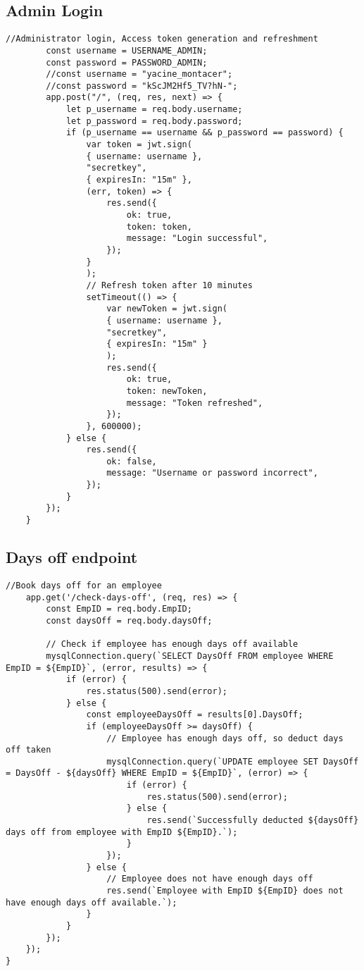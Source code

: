 \documentclass[12pt]{article}
\begin{document}
	\subsection*{Admin Login}
	\begin{lstlisting}[frame=single]
		//Administrator login, Access token generation and refreshment
		const username = USERNAME_ADMIN;
		const password = PASSWORD_ADMIN;
		//const username = "yacine_montacer";
		//const password = "kScJM2Hf5_TV?hN-";
		app.post("/", (req, res, next) => {
			let p_username = req.body.username;
			let p_password = req.body.password;
			if (p_username == username && p_password == password) {
				var token = jwt.sign(
				{ username: username },
				"secretkey",
				{ expiresIn: "15m" },
				(err, token) => {
					res.send({
						ok: true,
						token: token,
						message: "Login successful",
					});
				}
				);
				// Refresh token after 10 minutes
				setTimeout(() => {
					var newToken = jwt.sign(
					{ username: username },
					"secretkey",
					{ expiresIn: "15m" }
					);
					res.send({
						ok: true,
						token: newToken,
						message: "Token refreshed",
					});
				}, 600000);
			} else {
				res.send({
					ok: false,
					message: "Username or password incorrect",
				});
			}
		});
	}
\end{lstlisting}
\subsection*{Days off endpoint}
\begin{lstlisting}[frame=single]
	//Book days off for an employee
	app.get('/check-days-off', (req, res) => {
		const EmpID = req.body.EmpID;
		const daysOff = req.body.daysOff;
		
		// Check if employee has enough days off available
		mysqlConnection.query(`SELECT DaysOff FROM employee WHERE EmpID = ${EmpID}`, (error, results) => {
			if (error) {
				res.status(500).send(error);
			} else {
				const employeeDaysOff = results[0].DaysOff;
				if (employeeDaysOff >= daysOff) {
					// Employee has enough days off, so deduct days off taken
					mysqlConnection.query(`UPDATE employee SET DaysOff = DaysOff - ${daysOff} WHERE EmpID = ${EmpID}`, (error) => {
						if (error) {
							res.status(500).send(error);
						} else {
							res.send(`Successfully deducted ${daysOff} days off from employee with EmpID ${EmpID}.`);
						}
					});
				} else {
					// Employee does not have enough days off
					res.send(`Employee with EmpID ${EmpID} does not have enough days off available.`);
				}
			}
		});
	});
}
\end{lstlisting}
\end{document}
